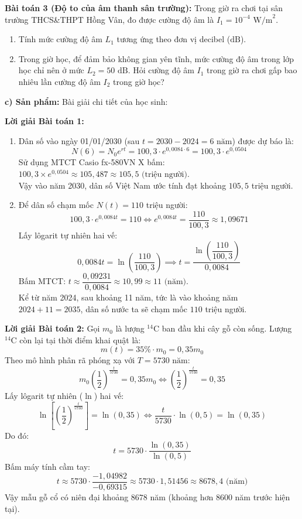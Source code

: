 \documentclass[12pt, a4paper]{article}
\begin{document}
\textbf{Bài toán 3 (Độ to của âm thanh sân trường):}
Trong giờ ra chơi tại sân trường THCS\&THPT Hồng Vân, đo được cường độ âm là $I_1 = 10^{-4}\text{ W/m}^2$.
\begin{enumerate}[label=\alph*)]
    \item Tính mức cường độ âm $L_1$ tương ứng theo đơn vị decibel ($\text{dB}$).
    \item Trong giờ học, để đảm bảo không gian yên tĩnh, mức cường độ âm trong lớp học chỉ nên ở mức $L_2 = 50\text{ dB}$. Hỏi cường độ âm $I_1$ trong giờ ra chơi gấp bao nhiêu lần cường độ âm $I_2$ trong giờ học?
\end{enumerate}

\noindent \textbf{c) Sản phẩm:}
Bài giải chi tiết của học sinh:

\textbf{Lời giải Bài toán 1:}
\begin{enumerate}[label=\alph*)]
    \item Dân số vào ngày 01/01/2030 (sau $t = 2030 - 2024 = 6\text{ năm}$) được dự báo là:
    $$N(6) = N_0 e^{rt} = 100{,}3 \cdot e^{0{,}0084 \cdot 6} = 100{,}3 \cdot e^{0{,}0504}$$
    Sử dụng MTCT Casio fx-580VN X bấm: $100{,}3 \times e^{0{,}0504} \approx 105{,}487 \approx 105{,}5 \text{ (triệu người)}$.\\
    Vậy vào năm 2030, dân số Việt Nam ước tính đạt khoảng $105{,}5$ triệu người.

    \item Để dân số chạm mốc $N(t) = 110$ triệu người:
    $$100{,}3 \cdot e^{0{,}0084 t} = 110 \iff e^{0{,}0084 t} = \dfrac{110}{100{,}3} \approx 1{,}09671$$
    Lấy lôgarit tự nhiên hai vế:
    $$0{,}0084 t = \ln\left(\dfrac{110}{100{,}3}\right) \implies t = \dfrac{\ln\left(\dfrac{110}{100{,}3}\right)}{0{,}0084}$$
    Bấm MTCT: $t \approx \dfrac{0{,}09231}{0{,}0084} \approx 10{,}99 \approx 11 \text{ (năm)}$.\\
    Kể từ năm 2024, sau khoảng 11 năm, tức là vào khoảng năm $2024 + 11 = 2035$, dân số nước ta sẽ chạm mốc $110$ triệu người.
\end{enumerate}

\textbf{Lời giải Bài toán 2:}
Gọi $m_0$ là lượng $^{14}\text{C}$ ban đầu khi cây gỗ còn sống.
Lượng $^{14}\text{C}$ còn lại tại thời điểm khai quật là:
$$m(t) = 35\% \cdot m_0 = 0{,}35 m_0$$
Theo mô hình phân rã phóng xạ với $T = 5730\text{ năm}$:
$$m_0 \left(\dfrac{1}{2}\right)^{\frac{t}{5730}} = 0{,}35 m_0 \iff \left(\dfrac{1}{2}\right)^{\frac{t}{5730}} = 0{,}35$$
Lấy lôgarit tự nhiên ($\ln$) hai vế:
$$\ln\left[\left(\dfrac{1}{2}\right)^{\frac{t}{5730}}\right] = \ln(0{,}35) \iff \dfrac{t}{5730} \cdot \ln(0{,}5) = \ln(0{,}35)$$
Do đó:
$$t = 5730 \cdot \dfrac{\ln(0{,}35)}{\ln(0{,}5)}$$
Bấm máy tính cầm tay:
$$t \approx 5730 \cdot \dfrac{-1{,}04982}{-0{,}69315} \approx 5730 \cdot 1{,}51456 \approx 8678{,}4 \text{ (năm)}$$
Vậy mẫu gỗ cổ có niên đại khoảng $8678$ năm (khoảng hơn 8600 năm trước hiện tại).
\end{document}
